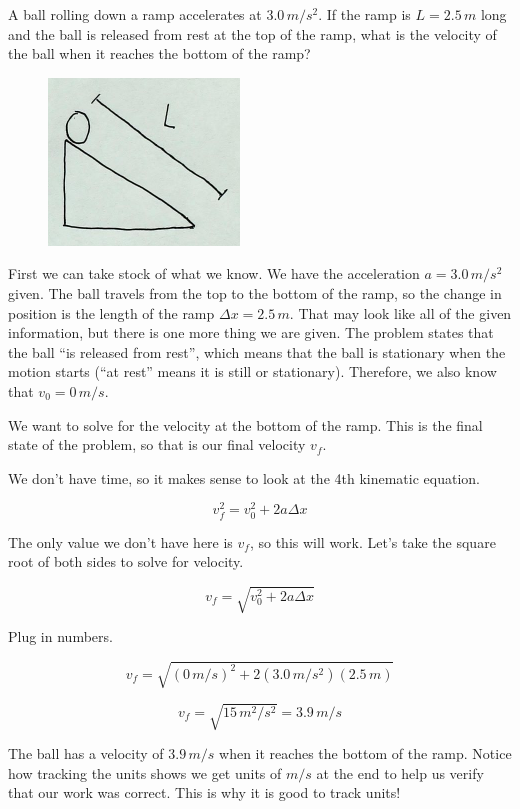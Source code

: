 \documentclass[12pt]{book}
\begin{document}
\begin{exampleblock}

A ball rolling down a ramp accelerates at $3.0 \, m/s^2$. If the ramp is $L = 2.5 \, m$ long and the ball is released from rest at the top of the ramp, what is the velocity of the ball when it reaches the bottom of the ramp?

\begin{figure}[h]
\centering
\includegraphics[scale=0.8]{example_units_ball_ramp.png}
\end{figure}

\hspace{10pt}

First we can take stock of what we know. We have the acceleration $a = 3.0 \, m/s^2$ given. The ball travels from the top to the bottom of the ramp, so the change in position is the length of the ramp $\Delta x = 2.5 \, m$. That may look like all of the given information, but there is one more thing we are given. The problem states that the ball ``is released from rest'', which means that the ball is stationary when the motion starts (``at rest'' means it is still or stationary). Therefore, we also know that $v_0 = 0 \, m/s$.

We want to solve for the velocity at the bottom of the ramp. This is the final state of the problem, so that is our final velocity $v_f$.

We don't have time, so it makes sense to look at the 4th kinematic equation.

\begin{equation}
v_f^2 = v_0^2 + 2 a \Delta x
\end{equation}

The only value we don't have here is $v_f$, so this will work. Let's take the square root of both sides to solve for velocity.

\begin{equation}
v_f = \sqrt{v_0^2 + 2 a \Delta x}
\end{equation}

Plug in numbers.

\begin{equation}
v_f = \sqrt{(0 \, m/s)^2 + 2 (3.0 \, m/s^2) (2.5 \, m)}
\end{equation}

\begin{equation}
v_f = \sqrt{15 \, m^2 / s^2} = 3.9 \, m/s
\end{equation}

The ball has a velocity of $3.9 \, m/s$ when it reaches the bottom of the ramp. Notice how tracking the units shows we get units of $m/s$ at the end to help us verify that our work was correct. This is why it is good to track units!

\end{exampleblock}
\end{document}
